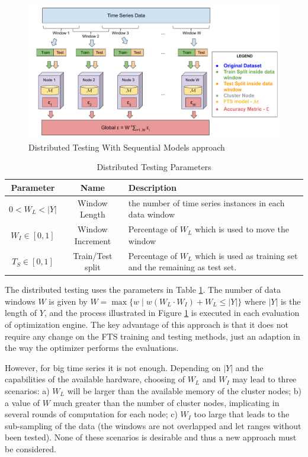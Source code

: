 \begin{figure}[htb]
    \centering
    \includegraphics[width=\textwidth]{figures/distributed_testing.pdf}
    \caption{Distributed Testing With Sequential Models approach}
    \label{fig:distributed_testing}
\end{figure}

\begin{table}[htb]
    \centering
    \begin{tabular}{|c|c|p{7cm}|} \hline
        \textbf{Parameter} & \textbf{Name} & \textbf{Description} \\ \hline
         $0 < W_L < |Y|$ & Window Length & the number of time series instances in each data window \\ \hline
         $W_I \in [0,1]$ & Window Increment & Percentage of $W_L$ which is used to move the window \\ \hline
         $T_S \in [0,1]$ & Train/Test split & Percentage of $W_L$ which is used as training set and the remaining as test set.  \\ \hline
    \end{tabular}
    \caption{Distributed Testing Parameters}
    \label{tab:distributed_testing}
\end{table}

The distributed testing uses the parameters in Table \ref{tab:distributed_testing}. The number of data windows $W$ is given by $W = \max \{w\; |\; w(W_L\cdot W_I) + W_L \leq |Y| \}$ where $|Y|$ is the length of $Y$, and the process illustrated in Figure \ref{fig:distributed_testing} is executed in each evaluation of optimization engine. The key advantage of this approach is that it does not require any change on the FTS training and testing methods, just an adaption in the way the optimizer performs the evaluations. 

However, for big time series it is not enough. Depending on $|Y|$ and the capabilities of the available hardware, choosing of $W_L$ and $W_I$ may lead to three scenarios: a) $W_L$ will be larger than the available memory of the cluster nodes; b) a value of $W$ much greater than the number of cluster nodes, implicating in several rounds of computation for each node; c) $W_I$ too large that leads to the sub-sampling of the data (the windows are not overlapped and let ranges without been tested). None of these scenarios is desirable and thus a new approach must be considered.

